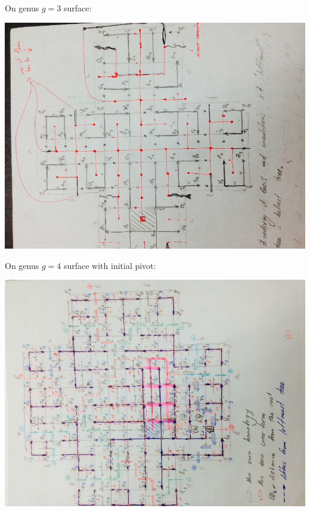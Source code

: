 \documentclass{article}
\begin{document}
\newpage
On genus $g = 3$ surface:
\begin{center}
\includegraphics[angle = -90, scale = 0.7]{figures/genus3.jpg}
\end{center}



\newpage
On genus $g = 4$ surface with initial pivot:
\begin{center}
\includegraphics[angle = -90, scale = 0.7]{figures/genus4_initialPivot.jpg}
\end{center}
\end{document}
